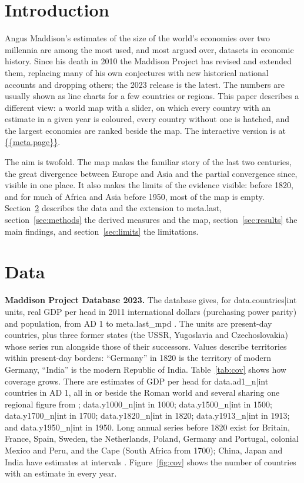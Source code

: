\documentclass[11pt,a4paper]{article}
\begin{document}
\section{Introduction}
Angus Maddison's estimates of the size of the world's economies over two millennia \citep{maddison2001,maddison2007} are among the most used, and most argued over, datasets in economic history. Since his death in 2010 the Maddison Project has revised and extended them, replacing many of his own conjectures with new historical national accounts and dropping others; the 2023 release \citep{mpd2023} is the latest. The numbers are usually shown as line charts for a few countries or regions. This paper describes a different view: a world map with a slider, on which every country with an estimate in a given year is coloured, every country without one is hatched, and the largest economies are ranked beside the map. The interactive version is at \url{{{meta.page}}}.

The aim is twofold. The map makes the familiar story of the last two centuries, the great divergence between Europe and Asia \citep{pomeranz2000} and the partial convergence since, visible in one place. It also makes the limits of the evidence visible: before 1820, and for much of Africa and Asia before 1950, most of the map is empty. Section~\ref{sec:data} describes the data and the extension to {{meta.last}}, section~\ref{sec:methods} the derived measures and the map, section~\ref{sec:results} the main findings, and section~\ref{sec:limits} the limitations.

\section{Data}\label{sec:data}
\textbf{Maddison Project Database 2023.} The database gives, for {{data.countries|int}} units, real GDP per head in 2011 international dollars (purchasing power parity) and population, from AD 1 to {{meta.last_mpd}} \citep{mpd2023}. The units are present-day countries, plus three former states (the USSR, Yugoslavia and Czechoslovakia) whose series run alongside those of their successors. Values describe territories within present-day borders: ``Germany'' in 1820 is the territory of modern Germany, ``India'' is the modern Republic of India. Table~\ref{tab:cov} shows how coverage grows. There are estimates of GDP per head for {{data.ad1_n|int}} countries in AD 1, all in or beside the Roman world and several sharing one regional figure from \citet{scheidel2009}; {{data.y1000_n|int}} in 1000; {{data.y1500_n|int}} in 1500; {{data.y1700_n|int}} in 1700; {{data.y1820_n|int}} in 1820; {{data.y1913_n|int}} in 1913; and {{data.y1950_n|int}} in 1950. Long annual series before 1820 exist for Britain, France, Spain, Sweden, the Netherlands, Poland, Germany and Portugal, colonial Mexico and Peru, and the Cape (South Africa from 1700); China, Japan and India have estimates at intervals \citep{broadberry2015,broadberry2018,bassino2019,broadberry2015india}. Figure~\ref{fig:cov} shows the number of countries with an estimate in every year.
\end{document}
